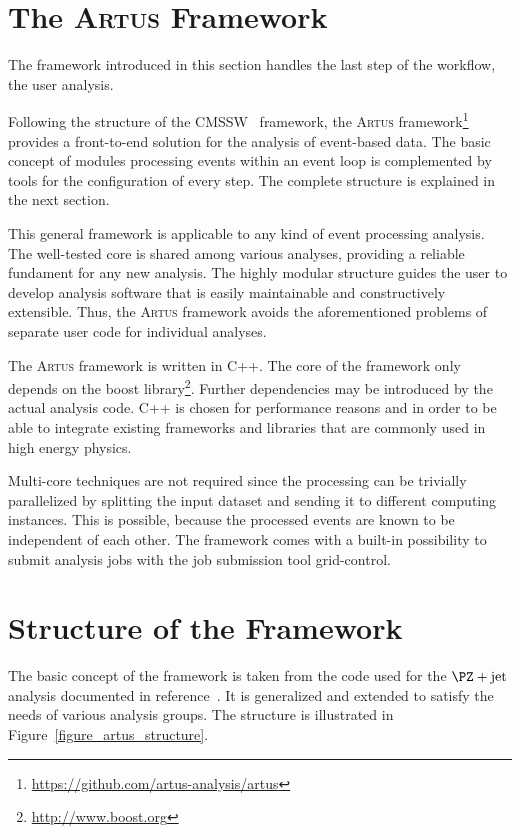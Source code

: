 \documentclass[3p]{elsarticle}
\newcommand{\software}[1]{\textsc{#1}\xspace}
\newcommand{\artus}{\software{Artus}}
\begin{document}
\section{The \artus Framework}
\label{section_artus_motivation}

The framework introduced in this section handles the last step of the workflow, the user analysis.

Following the structure of the CMSSW~\cite{cmssw} framework, the \artus framework\footnote{\url{https://github.com/artus-analysis/artus}} provides a front-to-end solution for the analysis of event-based data.
The basic concept of modules processing events within an event loop is complemented by tools for the configuration of every step.
The complete structure is explained in the next section.

This general framework is applicable to any kind of event processing analysis.
The well-tested core is shared among various analyses, providing a reliable fundament for any new analysis.
The highly modular structure guides the user to develop analysis software that is easily maintainable and constructively extensible.
Thus, the \artus framework avoids the aforementioned problems of separate user code for individual analyses.

The \artus framework is written in C++.
The core of the framework only depends on the boost library\footnote{\url{http://www.boost.org}}.
Further dependencies may be introduced by the actual analysis code.
C++ is chosen for performance reasons and in order to be able to integrate existing frameworks and libraries that are commonly used in high energy physics.

Multi-core techniques are not required since the processing can be trivially parallelized by splitting the input dataset and sending it to different computing instances.
This is possible, because the processed events are known to be independent of each other.
The framework comes with a built-in possibility to submit analysis jobs with the job submission tool grid-control.

\section{Structure of the Framework}
\label{section_artus_structure}

The basic concept of the framework is taken from the code used for the $\PZ+\text{jet}$ analysis documented in reference~\cite{joram_phd}.
It is generalized and extended to satisfy the needs of various analysis groups.
The structure is illustrated in Figure~\ref{figure_artus_structure}.
\end{document}

